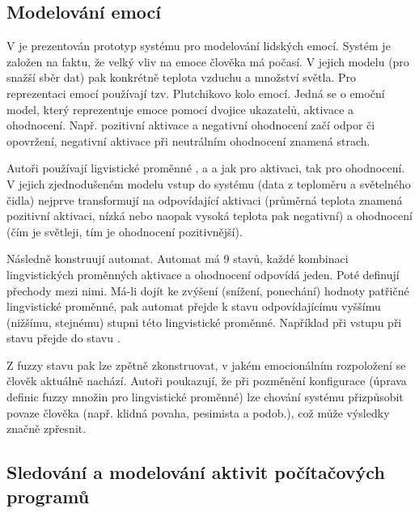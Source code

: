\documentclass[a4paper,10pt]{article}
\begin{document}
\subsection{Modelování emocí}
V \cite{HeiTri-SimEmoPerHumComInt} je prezentován prototyp systému pro modelování lidských emocí. Systém je založen na faktu, že velký vliv na emoce člověka má počasí. V jejich modelu (pro snažší sběr dat) pak konkrétně teplota vzduchu a množství světla. Pro reprezentaci emocí používají tzv. Plutchikovo kolo emocí. Jedná se o emoční model, který reprezentuje emoce pomocí dvojice ukazatelů, aktivace a ohodnocení. Např. pozitivní aktivace a negativní ohodnocení začí odpor či opovržení, negativní aktivace při neutrálním ohodnocení znamená strach.

Autoři používají ligvistické proměnné ,  a  a jak pro aktivaci, tak pro ohodnocení. V jejich zjednodušeném modelu vstup do systému (data z teploměru a světelného čidla) nejprve transformují na odpovídající aktivaci (průměrná teplota znamená pozitivní aktivaci, nízká nebo naopak vysoká teplota pak negativní) a ohodnocení (čím je světleji, tím je ohodnocení pozitivnější).

Následně konstruují automat. Automat má 9 stavů, každé kombinaci lingvistických proměnných aktivace a ohodnocení odpovídá jeden. Poté definují přechody mezi nimi. Má-li dojít ke zvýšení (snížení, ponechání) hodnoty patřičné lingvistické proměnné, pak automat přejde k stavu odpovídajícímu vyššímu (nižšímu, stejnému) stupni této lingvistické proměnné. Například při vstupu  při stavu  přejde do stavu . 

Z fuzzy stavu pak lze zpětně zkonstruovat, v jakém emocionálním rozpoložení se člověk aktuálně nachází. Autoři poukazují, že při pozměnění konfigurace (úprava definic fuzzy množin pro lingvistické proměnné) lze chování systému přizpůsobit povaze člověka (např. klidná povaha, pesimista a podob.), což může výsledky značně zpřesnit.


\subsection{Sledování a modelování aktivit počítačových programů}
\end{document}
